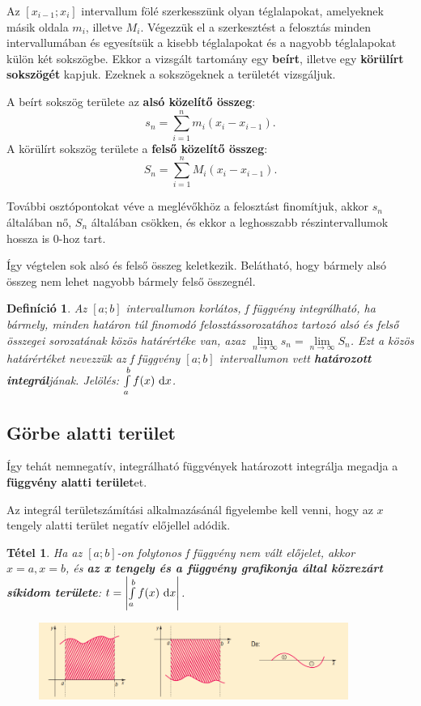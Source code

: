 \documentclass[12pt,a4paper]{article}
\newtheorem{theorem}{Tétel} [section]
\newtheorem{definition}{Definíció} [section]
\begin{document}
Az $[x_{i - 1}; x_i]$ intervallum fölé szerkesszünk olyan téglalapokat, amelyeknek másik oldala $m_i$, illetve $M_i$. Végezzük el a szerkesztést a felosztás minden intervallumában és egyesítsük a kisebb téglalapokat és a nagyobb téglalapokat külön két sokszögbe. Ekkor a vizsgált tartomány egy \textbf{beírt}, illetve egy \textbf{körülírt sokszögét} kapjuk. Ezeknek a sokszögeknek a területét vizsgáljuk.

A beírt sokszög területe az \textbf{alsó közelítő összeg}:
$$s_n=\sum_{i=1}^n m_i(x_i-x_{i-1}).$$
A körülírt sokszög területe a \textbf{felső közelítő összeg}:
$$S_n=\sum_{i=1}^n M_i(x_i-x_{i-1}).$$

További osztópontokat véve a meglévőkhöz a felosztást finomítjuk, akkor $s_n$ általában nő, $S_n$ általában csökken, és ekkor a leghosszabb részintervallumok hossza is 0-hoz tart.

Így végtelen sok alsó és felső összeg keletkezik. Belátható, hogy bármely alsó összeg nem lehet nagyobb bármely felső összegnél.
\begin{definition}
Az $[a; b]$ intervallumon korlátos, f függvény integrálható, ha bármely, minden határon túl finomodó felosztássorozatához tartozó alsó és felső összegei sorozatának közös határértéke van, azaz $\lim\limits_{n\to \infty} s_n=\lim\limits_{n\to \infty} S_n$. Ezt a közös határértéket nevezzük az f függvény $[a; b]$ intervallumon vett \textbf{határozott integrál}jának. Jelölés: $\int\limits_a^bf(x) {\normalfont\text{ d}}x$.
\end{definition}

\subsection{Görbe alatti terület}

Így tehát nemnegatív, integrálható függvények határozott integrálja megadja a \textbf{függvény alatti terület}et.

Az integrál területszámítási alkalmazásánál figyelembe kell venni, hogy az $x$ tengely alatti terület negatív előjellel adódik.

\begin{theorem}
Ha az $[a; b]$-on folytonos f függvény nem vált előjelet, akkor $x = a, x = b$, és \textbf{az x tengely és a függvény grafikonja által közrezárt síkidom területe}: $t=\left|\int\limits_a^bf(x){\normalfont\text{ d}}x \right|$.
\begin{figure}[h]
\centering
\includegraphics[width=0.9\textwidth]{gorbe_alatti_terulet_integral}
\end{figure}
\end{theorem}
\end{document}
